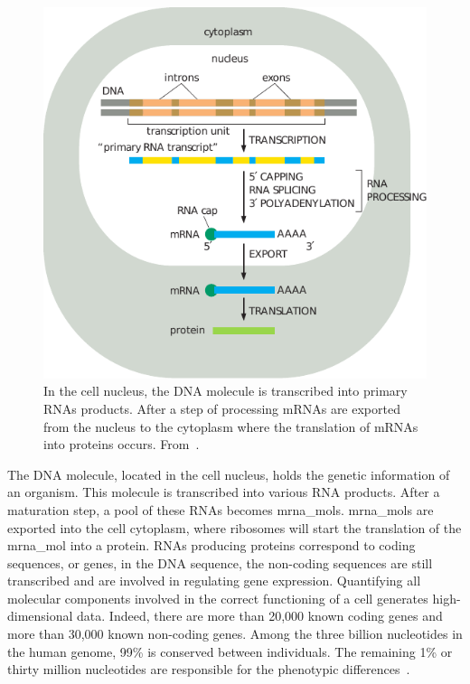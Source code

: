 \documentclass[../main.tex]{subfiles}
\begin{document}
	\begin{figure}[htbp]
		\centering
		\includegraphics{gene_expression.pdf}
		\caption[Gene expression]{In the cell nucleus, the DNA molecule is transcribed into primary RNAs products. After a step of processing mRNAs are exported from the nucleus to the cytoplasm where the translation of mRNAs into proteins occurs. From~\cite{alberts2022molecular}.}\label{fig:gene_expression}
	\end{figure}

	The DNA molecule, located in the cell nucleus, holds the genetic information of an organism.
	This molecule is transcribed into various RNA products.
	After a maturation step, a pool of these RNAs becomes \glspl{mrna_mol}.
	\glspl{mrna_mol} are exported into the cell cytoplasm, where ribosomes will start the translation of the \gls{mrna_mol} into a protein.
	RNAs producing proteins correspond to coding sequences, or genes,  in the DNA sequence, the non-coding sequences are still transcribed and are involved in regulating gene expression.
	Quantifying all molecular components involved in the correct functioning of a cell generates high-dimensional data.
	Indeed, there are more than 20,000 known coding genes and more than 30,000 known non-coding genes.
	Among the three billion nucleotides in the human genome, 99\% is conserved between individuals.
	The remaining 1\% or thirty million nucleotides are responsible for the phenotypic differences~\cite{GeneticVariation}.
\end{document}
